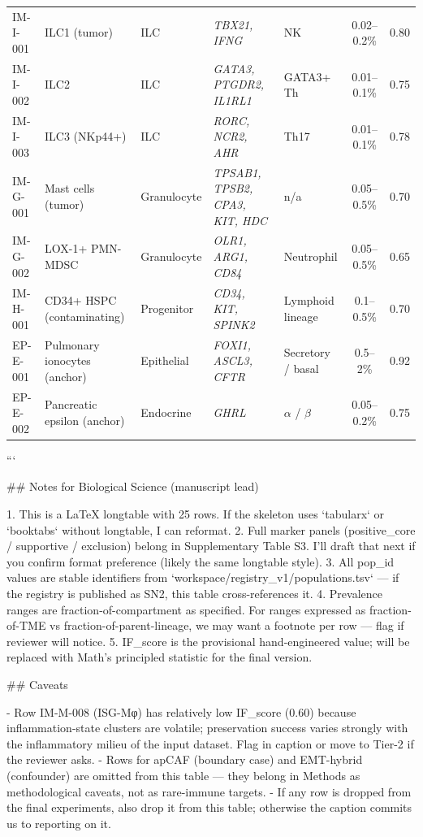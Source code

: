 \begin{longtable}{@{}l l l p{32mm} p{30mm} c l@{}}
IM-I-001 & ILC1 (tumor)              & ILC           & \textit{TBX21, IFNG}                       & NK                                     & 0.02--0.2\%  & 0.80 \\
IM-I-002 & ILC2                      & ILC           & \textit{GATA3, PTGDR2, IL1RL1}             & GATA3+ Th                              & 0.01--0.1\%  & 0.75 \\
IM-I-003 & ILC3 (NKp44+)             & ILC           & \textit{RORC, NCR2, AHR}                   & Th17                                   & 0.01--0.1\%  & 0.78 \\
IM-G-001 & Mast cells (tumor)        & Granulocyte   & \textit{TPSAB1, TPSB2, CPA3, KIT, HDC}     & n/a                                    & 0.05--0.5\%  & 0.70 \\
IM-G-002 & LOX-1+ PMN-MDSC           & Granulocyte   & \textit{OLR1, ARG1, CD84}                  & Neutrophil                             & 0.05--0.5\%  & 0.65 \\
IM-H-001 & CD34+ HSPC (contaminating)& Progenitor    & \textit{CD34, KIT, SPINK2}                 & Lymphoid lineage                       & 0.1--0.5\%   & 0.70 \\
EP-E-001 & Pulmonary ionocytes (anchor) & Epithelial & \textit{FOXI1, ASCL3, CFTR}                & Secretory / basal                      & 0.5--2\%     & 0.92 \\
EP-E-002 & Pancreatic epsilon (anchor) & Endocrine   & \textit{GHRL}                              & $\alpha$ / $\beta$                     & 0.05--0.2\%  & 0.75 \\
\end{longtable}
```

## Notes for Biological Science (manuscript lead)

1. This is a LaTeX longtable with 25 rows. If the skeleton uses `tabularx` or `booktabs` without longtable, I can reformat.
2. Full marker panels (positive_core / supportive / exclusion) belong in Supplementary Table S3. I'll draft that next if you confirm format preference (likely the same longtable style).
3. All pop_id values are stable identifiers from `workspace/registry_v1/populations.tsv` — if the registry is published as SN2, this table cross-references it.
4. Prevalence ranges are fraction-of-compartment as specified. For ranges expressed as fraction-of-TME vs fraction-of-parent-lineage, we may want a footnote per row — flag if reviewer will notice.
5. IF_score is the provisional hand-engineered value; will be replaced with Math's principled statistic for the final version.

## Caveats

- Row IM-M-008 (ISG-Mφ) has relatively low IF_score (0.60) because inflammation-state clusters are volatile; preservation success varies strongly with the inflammatory milieu of the input dataset. Flag in caption or move to Tier-2 if the reviewer asks.
- Rows for apCAF (boundary case) and EMT-hybrid (confounder) are omitted from this table — they belong in Methods as methodological caveats, not as rare-immune targets.
- If any row is dropped from the final experiments, also drop it from this table; otherwise the caption commits us to reporting on it.

